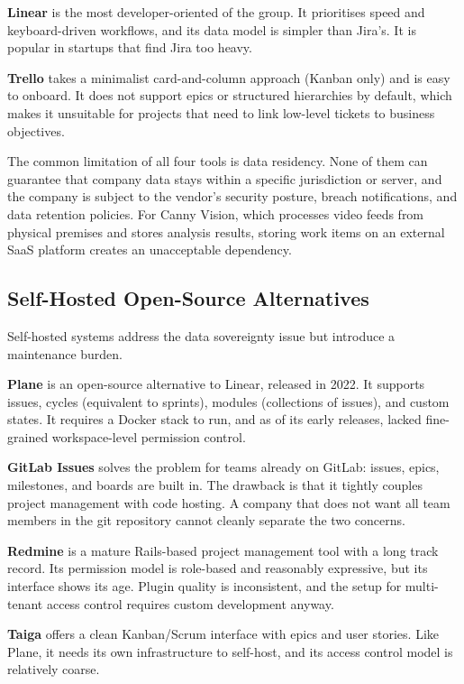 \textbf{Linear} is the most developer-oriented of the group. It prioritises speed and keyboard-driven workflows, and its data model is simpler than Jira's. It is popular in startups that find Jira too heavy.

\textbf{Trello} takes a minimalist card-and-column approach (Kanban only) and is easy to onboard. It does not support epics or structured hierarchies by default, which makes it unsuitable for projects that need to link low-level tickets to business objectives.

The common limitation of all four tools is data residency. None of them can guarantee that company data stays within a specific jurisdiction or server, and the company is subject to the vendor's security posture, breach notifications, and data retention policies. For Canny Vision, which processes video feeds from physical premises and stores analysis results, storing work items on an external SaaS platform creates an unacceptable dependency.

\subsection{Self-Hosted Open-Source Alternatives}

Self-hosted systems address the data sovereignty issue but introduce a maintenance burden.

\textbf{Plane} is an open-source alternative to Linear, released in 2022. It supports issues, cycles (equivalent to sprints), modules (collections of issues), and custom states. It requires a Docker stack to run, and as of its early releases, lacked fine-grained workspace-level permission control.

\textbf{GitLab Issues} solves the problem for teams already on GitLab: issues, epics, milestones, and boards are built in. The drawback is that it tightly couples project management with code hosting. A company that does not want all team members in the git repository cannot cleanly separate the two concerns.

\textbf{Redmine} is a mature Rails-based project management tool with a long track record. Its permission model is role-based and reasonably expressive, but its interface shows its age. Plugin quality is inconsistent, and the setup for multi-tenant access control requires custom development anyway.

\textbf{Taiga} offers a clean Kanban/Scrum interface with epics and user stories. Like Plane, it needs its own infrastructure to self-host, and its access control model is relatively coarse.

